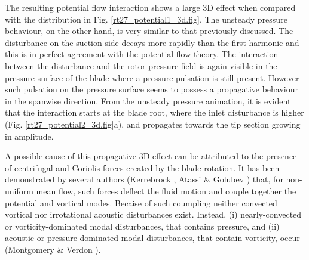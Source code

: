 %
 The resulting potential flow interaction shows a large 3D
 effect when compared with the distribution in Fig. \ref{rt27_potential1_3d.fig}.
 The unsteady pressure behaviour, on the other hand, is very similar to that
 previously discussed. The disturbance on the suction
 side decays more rapidly than the first harmonic and this
 is in perfect agreement with the potential flow theory.
 The interaction between the disturbance and the rotor pressure field is
 again visible in the pressure surface of the blade where a
 pressure pulsation is still present.
 However such pulsation on the pressure surface seems to
 possess a propagative behaviour in the spanwise direction.
 From the unsteady pressure animation, it is evident that the
 interaction starts at the blade root, where
 the inlet disturbance is higher (Fig. \ref{rt27_potential2_3d.fig}a),
 and propagates towards the tip section growing in amplitude.

 A possible cause of this propagative 3D effect can
 be attributed to the presence of centrifugal and Coriolis forces
 created by the blade rotation.
 It has been demonstrated by several authors
 (Kerrebrock ,
  Atassi \& Golubev ) that,
 for non-uniform mean flow, such forces deflect
 the fluid motion and couple together the potential
 and vortical modes.
 Becaise of such coumpling neither convected vortical nor
 irrotational acoustic disturbances exist. Instead,
 (i) nearly-convected or vorticity-dominated modal disturbances,
 that contains pressure, and (ii) acoustic or pressure-dominated
 modal disturbances, that contain vorticity, occur
 (Montgomery \& Verdon ).
%
%
